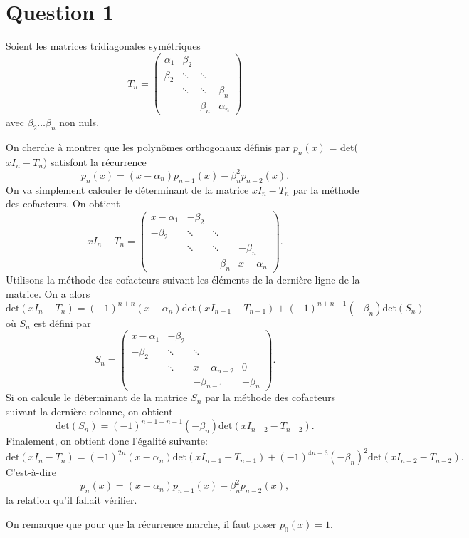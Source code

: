 \section*{Question 1}
Soient les matrices tridiagonales symétriques
$$T_n =
\begin{pmatrix}
\alpha_1 & \beta_2 & & \\
\beta_2 & \ddots & \ddots & \\
 & \ddots & \ddots & \beta_n \\
 & & \beta_n & \alpha_n
\end{pmatrix}
$$
avec $\beta_2 \hdots \beta_n$ non nuls.

On cherche à montrer que les polynômes orthogonaux définis par $p_n(x)$ = det($x I_n - T_n$) satisfont la récurrence $$p_n(x) = (x-\alpha_n)p_{n-1}(x) - \beta_n^2 p_{n-2}(x).$$
On va simplement calculer le déterminant de la matrice $x I_n - T_n$ par la méthode des cofacteurs. On obtient
$$x I_n - T_n =
\begin{pmatrix}
x-\alpha_1 & -\beta_2 & & \\
-\beta_2 & \ddots & \ddots & \\
 & \ddots & \ddots & -\beta_n \\
 & & -\beta_n & x-\alpha_n
\end{pmatrix}.
$$
Utilisons la méthode des cofacteurs suivant les éléments de la dernière ligne de la matrice. On a alors $$\text{det}(x I_n - T_n) = (-1)^{n+n}(x-\alpha_n)\text{det}(x I_{n-1} - T_{n-1}) + (-1)^{n+n-1}(-\beta_n)\text{det}(S_n)$$ où $S_n$ est défini par
$$S_n =
\begin{pmatrix}
x-\alpha_1 & -\beta_2 & & \\
-\beta_2 & \ddots & \ddots & \\
 & \ddots & x-\alpha_{n-2} & 0 \\
 & & -\beta_{n-1} & -\beta_n
\end{pmatrix}.
$$
Si on calcule le déterminant de la matrice $S_n$ par la méthode des cofacteurs suivant la dernière colonne, on obtient $$\text{det}(S_n) = (-1)^{n-1+n-1}(-\beta_n)\text{det}(x I_{n-2} - T_{n-2}).$$
Finalement, on obtient donc l'égalité suivante:
$$\text{det}(x I_n - T_n) = (-1)^{2n}(x-\alpha_n)\text{det}(x I_{n-1} - T_{n-1}) + (-1)^{4n-3}(-\beta_n)^2\text{det}(x I_{n-2} - T_{n-2}).$$
C'est-à-dire
\begin{equation}\label{equ_recur}
  p_n(x) = (x - \alpha_n)p_{n-1}(x) - \beta_n^2p_{n-2}(x),
\end{equation}
la relation qu'il fallait vérifier.

On remarque que pour que la récurrence marche,
il faut poser $p_0(x) = 1$.
